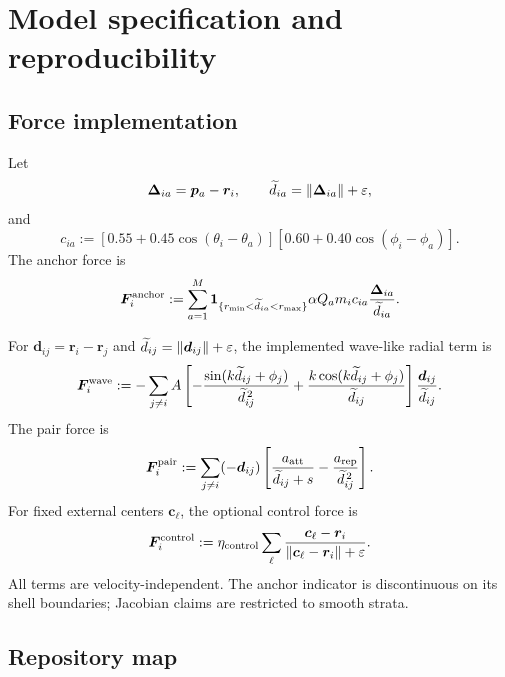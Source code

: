 \section{Model specification and reproducibility}
\label{app:model-specification}

\subsection{Force implementation}

Let
\[
\bm\Delta_{ia}=\bm p_a-\bm r_i,
\qquad
\widetilde d_{ia}=\left\lVert \bm\Delta_{ia}\right\rVert+\varepsilon,
\]
and
\[
c_{ia}
:=
[0.55+0.45\cos(\theta_i-\theta_a)]
[0.60+0.40\cos(\phi_i-\phi_a)].
\]
The anchor force is
\[
\bm F_i^{\rm anchor}
:=
\sum_{a=1}^M
\mathbf 1_{\{r_{\min}<\widetilde d_{ia}<r_{\max}\}}
\alpha Q_a m_i c_{ia}
\frac{\bm\Delta_{ia}}{\widetilde d_{ia}}.
\]

For \(\bm d_{ij}=\bm r_i-\bm r_j\) and
\(\widetilde d_{ij}=\left\lVert \bm d_{ij}\right\rVert+\varepsilon\), the implemented wave-like radial term is
\[
\bm F_i^{\rm wave}
:=
-\sum_{j\neq i}
A\left[
-\frac{\sin(k\widetilde d_{ij}+\phi_j)}
      {\widetilde d_{ij}^{\,2}}
+\frac{k\cos(k\widetilde d_{ij}+\phi_j)}
      {\widetilde d_{ij}}
\right]
\frac{\bm d_{ij}}{\widetilde d_{ij}}.
\]
The pair force is
\[
\bm F_i^{\rm pair}
:=
\sum_{j\neq i}
(-\bm d_{ij})
\left[
\frac{a_{\rm att}}{\widetilde d_{ij}+s}
-\frac{a_{\rm rep}}{\widetilde d_{ij}^{\,2}}
\right].
\]
For fixed external centers \(\bm c_\ell\), the optional control force is
\[
\bm F_i^{\rm control}
:=
\eta_{\rm control}
\sum_\ell
\frac{\bm c_\ell-\bm r_i}
{\left\lVert \bm c_\ell-\bm r_i\right\rVert+\varepsilon}.
\]
All terms are velocity-independent. The anchor indicator is discontinuous on its shell boundaries; Jacobian claims are restricted to smooth strata.

\subsection{Repository map}

